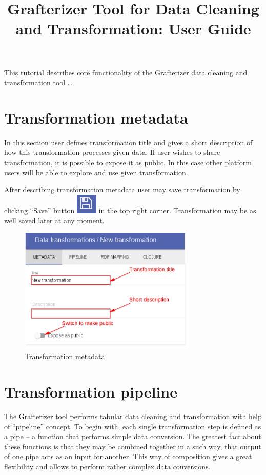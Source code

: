 \documentclass[USenglish]{article}
\title{Grafterizer Tool for Data Cleaning and Transformation: User Guide}
\begin{document}
 \maketitle{}
This tutorial describes core functionality of the Grafterizer data cleaning and transformation tool …




\section{Transformation metadata}
In this section user defines transformation title and gives a short description of how this transformation processes given data. If user wishes to share transformation, it is possible to expose it as public. In this case other platform users will be able to explore and use given transformation.


After describing transformation metadata user may save transformation by clicking “Save” button {\includegraphics[scale=0.8]{save.png}} in the top right corner. Transformation may be as well saved later at any moment.


\begin{center}
\begin{figure}[!htbp]
\centering
\includegraphics[height=6cm] {meta.png}
 \caption{Transformation metadata \label{meta}}
\end{figure}
\end{center}

\section{Transformation pipeline}
The Grafterizer tool performs tabular data cleaning and transformation with help of “pipeline” concept.  To begin with, each single transformation step is defined as a pipe – a function that performs simple data conversion. The greatest fact about these functions is that they may be combined together in a such way, that output of one pipe acts as an input for another. This way of composition gives a great flexibility and allows to perform rather complex data conversions.
\end{document}
